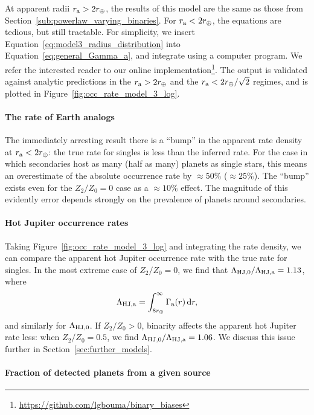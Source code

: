 \documentclass[12pt,modern]{aastex61}
\renewcommand{\a}{_{\rm a}}
\begin{document}
At apparent radii $r\a > 2r_\oplus$, the results of this model are the
same as those from Section~\ref{sub:powerlaw_varying_binaries}.  For
$r\a < 2r_\oplus$, the equations are tedious, but still tractable.
For simplicity, we insert Equation~\ref{eq:model3_radius_distribution}
into Equation~\ref{eq:general_Gamma_a}, and integrate using a computer
program. We refer the interested reader to our online
implementation\footnote{\url{https://github.com/lgbouma/binary_biases}}.
The output is validated against analytic predictions in the $r\a >
2r_\oplus$ and the $r\a < 2r_\oplus/\sqrt{2}$ regimes, and is plotted
in Figure~\ref{fig:occ_rate_model_3_log}.


\paragraph{The rate of Earth analogs} The immediately arresting result
there is a ``bump'' in the apparent rate density at $r\a < 2r_\oplus$:
the true rate for singles is less than the inferred rate.  For the
case in which secondaries host as many (half as many) planets as
single stars, this means an overestimate of the absolute occurrence
rate by $\approx 50\%$ ($\approx 25\%$).  The ``bump'' exists even for
the $Z_2/Z_0=0$ case as a $\approx 10\%$ effect.  The magnitude of
this evidently error depends strongly on the prevalence of planets
around secondaries.

\paragraph{Hot Jupiter occurrence rates} Taking
Figure~\ref{fig:occ_rate_model_3_log} and integrating the rate
density, we can compare the apparent hot Jupiter occurrence rate with
the true rate for singles.  In the most extreme case of $Z_2/Z_0=0$,
we find that $\Lambda_{{\rm HJ},0}/\Lambda_{\rm HJ,a} = 1.13$, where
\begin{equation}
    \Lambda_{\rm HJ,a} =
      \int_{8r_\oplus}^{\infty} \Gamma\a(r)\,{\rm d}r,
\end{equation}
and similarly for $\Lambda_{\rm HJ,0}$.
If $Z_2/Z_0>0$, binarity affects the apparent hot Jupiter rate less:
when $Z_2/Z_0=0.5$, we find $\Lambda_{{\rm HJ},0}/\Lambda_{\rm HJ,a} =
1.06$.  We discuss this issue further in
Section~\ref{sec:further_models}.

\paragraph{Fraction of detected planets from a given source}
\end{document}
